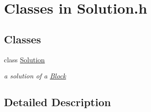 \hypertarget{group___solution___c_l_a_s_s_e_s}{}\section{Classes in Solution.\+h}
\label{group___solution___c_l_a_s_s_e_s}
\subsection*{Classes}
\begin{DoxyCompactItemize}
\item 
class \mbox{\hyperlink{class_s_m_spp__di__unipi__it_1_1_solution}{Solution}}
\begin{DoxyCompactList}\small\item\em a solution of a \mbox{\hyperlink{class_s_m_spp__di__unipi__it_1_1_block}{Block}} \end{DoxyCompactList}\end{DoxyCompactItemize}


\subsection{Detailed Description}

